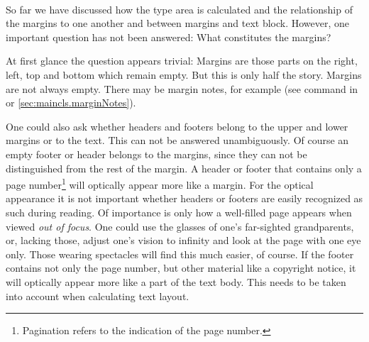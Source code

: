 %
%
\begin{Declaration}
  \\
\end{Declaration}%
\begin{Explain}%
  So far we have discussed how the type area is
  calculated and the relationship of the
  margins to one another and between margins and text
  block. However, one important question has not been answered: What
  constitutes the margins?

  At first glance the question appears trivial: Margins are those
  parts on the right, left, top and bottom which remain empty. But
  this is only half the story. Margins are not always empty. There may
  be margin notes, for example (see  command in
  \cite{lshort} or \autoref{sec:maincls.marginNotes}).

  One could also ask whether headers and
  footers belong to the upper and lower margins or
  to the text. This can not be answered unambiguously. Of course an
  empty footer or header belongs to the margins, since they can not be
  distinguished from the rest of the margin. A header or footer that
  contains only a page
  number\footnote{Pagination refers to
    the indication of the page number.} will optically appear more
  like a margin. For the optical appearance it is not important
  whether headers or footers are easily recognized as such during
  reading.  Of importance is only how a well-filled page appears when
  viewed \emph{out of focus}. One could use the glasses of one's
  far-sighted grandparents, or, lacking those, adjust one's vision to
  infinity and look at the page with one eye only. Those wearing
  spectacles will find this much easier, of course.  If the footer
  contains not only the page number, but other material like a
  copyright notice, it will optically appear more like a part of the
  text body.  This needs to be taken into account when calculating
  text layout.


\end{Explain}
